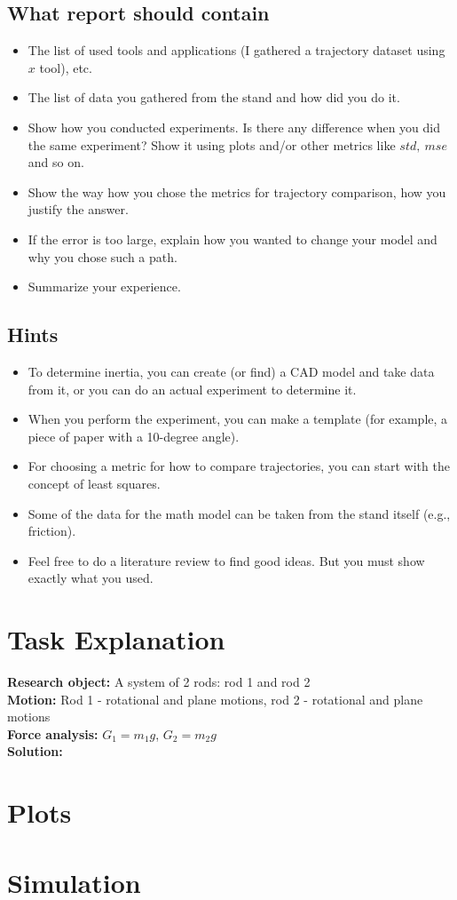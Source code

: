 \subsection{What report should contain}
\begin{itemize}
\item The list of used tools and applications (I gathered a trajectory dataset using $x$ tool), etc.
\item The list of data you gathered from the stand and how did you do it.
\item Show how you conducted experiments. Is there any difference when you did the same experiment? Show it using plots and/or other metrics like $std,\ mse$ and so on.
\item Show the way how you chose the metrics for trajectory comparison, how you justify the answer.
\item If the error is too large, explain how you wanted to change your model and why you chose such a path.
\item Summarize your experience.
\end{itemize}

\subsection{Hints}
\begin{itemize}
    \item To determine inertia, you can create (or find) a CAD model and take data from it, or you can do an actual experiment to determine it.
    \item When you perform the experiment, you can make a template (for example, a piece of paper with a 10-degree angle).
    \item For choosing a metric for how to compare trajectories, you can start with the concept of least squares.
    \item Some of the data for the math model can be taken from the stand itself (e.g., friction).
    \item Feel free to do a literature review to find good ideas. But you must show exactly what you used.
\end{itemize}

\section{Task Explanation}

\textbf{Research object:} A system of 2 rods: rod 1 and rod 2\\
\textbf{Motion:} Rod 1 - rotational and plane motions, rod 2 - rotational and plane motions\\
\textbf{Force analysis:} $G_1 = m_1 g$, $G_2 = m_2 g$\\
\textbf{Solution:}

\section{Plots}
\section{Simulation}

